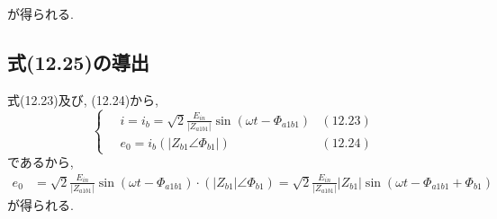 \documentclass[fleqn,11pt,a4paper,dvipdfmx]{jsarticle}
\numberwithin{equation}{section}
\begin{document}
が得られる. 

\subsection*{式(12.25)の導出}
式(12.23)及び, (12.24)から, 
\begin{equation*}
  \left\{ \,
  \begin{aligned}
     & i = i_b = \sqrt{2} \frac{ E_{in} }{\left| Z_{a1b1} \right|}\sin \left(\omega t - \Phi_{a1b1}\right) & \left(12.23\right) \\
     & e_0 = i_b \left(\left|Z_{b1} \angle \Phi_{b1}\right|\right)                                         & \left(12.24\right)
  \end{aligned}
  \right.
\end{equation*}
であるから, 
\begin{align*}
  e_0 & = \sqrt{2} \frac{ E_{in} }{\left| Z_{a1b1} \right|}\sin \left(\omega t - \Phi_{a1b1}\right) \cdot \left(\left|Z_{b1}\right| \angle \Phi_{b1}\right) 
  = \sqrt{2} \frac{ E_{in} }{\left| Z_{a1b1} \right|} \left|Z_{b1}\right| \sin {\left(\omega t - \Phi_{a1b1} + \Phi_{b1}\right)}
\end{align*}
が得られる. 
\end{document}
